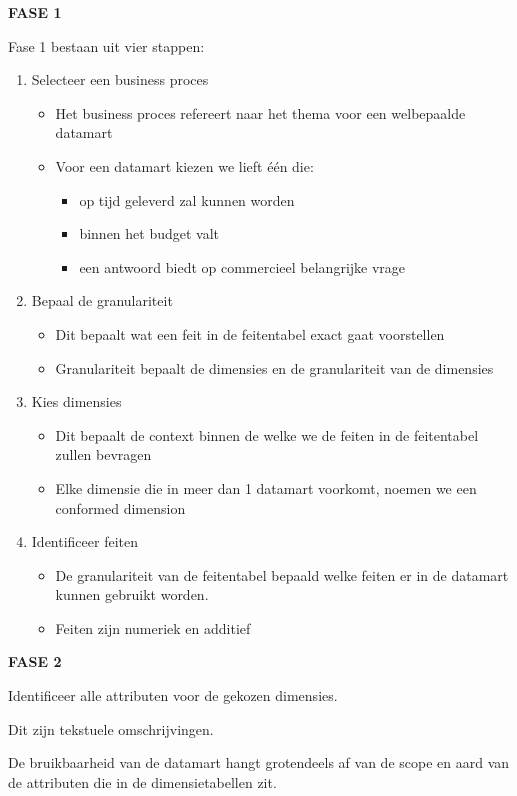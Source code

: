 \documentclass[a4paper,12pt]{article}
\begin{document}
\textbf{FASE 1}

Fase 1 bestaan uit vier stappen:
\begin{enumerate}
\item Selecteer een business proces
	\begin{itemize}
	\item Het business proces refereert naar het thema voor een welbepaalde datamart
	\item Voor een datamart kiezen we lieft één die:
		\begin{itemize}
		\item op tijd geleverd zal kunnen worden
		\item binnen het budget valt
		\item een antwoord biedt op commercieel belangrijke vrage
		\end{itemize}
	\end{itemize}
\item Bepaal de granulariteit
	\begin{itemize}
	\item Dit bepaalt wat een feit in de feitentabel exact gaat voorstellen
	\item Granulariteit bepaalt de dimensies en de granulariteit van de dimensies
	\end{itemize}
\item Kies dimensies
	\begin{itemize}
	\item Dit bepaalt de context binnen de welke we de feiten in de feitentabel zullen bevragen
	\item Elke dimensie die in meer dan 1 datamart voorkomt, noemen we een conformed dimension
	\end{itemize}
\item Identificeer feiten
	\begin{itemize}
	\item De granulariteit van de feitentabel bepaald welke feiten er in de datamart kunnen gebruikt worden.
	\item Feiten zijn numeriek en additief
	\end{itemize}
\end{enumerate}
\textbf{FASE 2}

Identificeer alle attributen voor de gekozen dimensies.

Dit zijn tekstuele omschrijvingen.

De bruikbaarheid van de datamart hangt grotendeels af van de scope en aard van de attributen die in de dimensietabellen zit.
\end{document}
